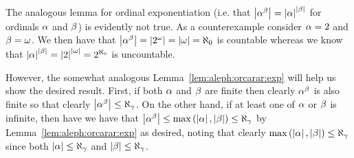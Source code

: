 {{The analogous lemma for ordinal exponentiation (i.e. that $\left| \alpha^\beta \right| = \left| \alpha \right|^{\left| \beta \right|}$ for ordinals $\alpha$ and $\beta$) is evidently not true.
As a counterexample consider $\alpha = 2$ and $\beta = \omega$.
We then have that $\left| \alpha^\beta \right| = \left| 2^\omega \right| = \left| \omega \right| = \aleph_0$ is countable whereas we know that $\left| \alpha \right|^{\left| \beta \right|} = \left| 2 \right|^{\left| \omega \right|} = 2^{\aleph_0}$ is uncountable.

However, the somewhat analogous Lemma~\ref{lem:aleph:orcarar:exp} will help us show the desired result.
First, if both $\alpha$ and $\beta$ are finite then clearly $\alpha^\beta$ is also finite so that clearly $\left| \alpha^\beta \right| \leq \aleph_\gamma$.
On the other hand, if at least one of $\alpha$ or $\beta$ is infinite, then have we have that $\left| \alpha^\beta \right| \leq \max\left( \left| \alpha \right|, \left| \beta \right| \right) \leq \aleph_\gamma$ by Lemma~\ref{lem:aleph:orcarar:exp} as desired, noting that clearly $\max\left( \left| \alpha \right|, \left| \beta \right| \right) \leq \aleph_\gamma$ since both $\left| \alpha \right| \leq \aleph_\gamma$ and $\left| \beta \right| \leq \aleph_\gamma$.
}
}


